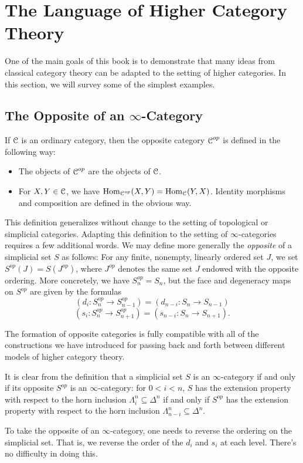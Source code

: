 \section{The Language of Higher Category Theory}\label{langur}


\setcounter{theorem}{0}

One of the main goals of this book is to demonstrate that many ideas from classical category theory can be adapted to the setting of higher categories. In this section, we will survey some of the simplest examples.

\subsection{The Opposite of an $\infty$-Category}\label{working}
\begin{1.2.1 Opposite of an inf-cat}
If $\operatorname{\mathcal{C}}$ is an ordinary category, then the opposite category
$\operatorname{\mathcal{C}}^{op}$ is defined in the following way:

\begin{itemize}
\item The objects of $\operatorname{\mathcal{C}}^{op}$ are the objects of $\operatorname{\mathcal{C}}$.
\item For $X,Y \in \operatorname{\mathcal{C}}$, we have $\operatorname{Hom}_{\operatorname{\mathcal{C}}^{op}}(X,Y) =
\operatorname{Hom}_{\operatorname{\mathcal{C}}}(Y,X)$. Identity morphisms and composition are defined
in the obvious way.
\end{itemize}

This definition generalizes without change to the setting of topological or simplicial categories. Adapting this definition to the setting of $\infty$-categories requires a few additional words.
We may define more generally the {\it opposite} of a simplicial set
$S$ as follows: For any finite, nonempty, linearly ordered set
$J$, we set $S^{op}(J) = S(J^{op})$, where $J^{op}$ denotes the
same set $J$ endowed with the opposite ordering. More concretely,
we have $S^{op}_n = S_n$, but the face and degeneracy maps on
$S^{op}$ are given by the formulas
$$ (d_i: S^{op}_n \rightarrow S^{op}_{n-1}) = (d_{n-i}: S_n
\rightarrow S_{n-1})$$
$$ (s_i: S^{op}_n \rightarrow S^{op}_{n+1}) = (s_{n-i}: S_n
\rightarrow S_{n+1}).$$

The formation of opposite categories is fully compatible
with all of the constructions we have introduced for passing back
and forth between different models of higher category theory.

It is clear from the definition that a simplicial set $S$ is an $\infty$-category if and only if its opposite $S^{op}$ is an $\infty$-category: for $0 < i < n$, $S$ has the extension property
with respect to the horn inclusion $\Lambda^n_i \subseteq \Delta^n$ if
and only if $S^{op}$ has the extension property with respect to the horn inclusion
$\Lambda^n_{n-i} \subseteq \Delta^n$.
\begin{shaded}
To take the opposite of an $\infty$-category, one needs to reverse the ordering on the simplicial set. That is, we reverse the order of the $d_i$ and $s_i$ at each level. There's no difficulty in doing this.


\end{shaded}
\end{1.2.1 Opposite of an inf-cat}

